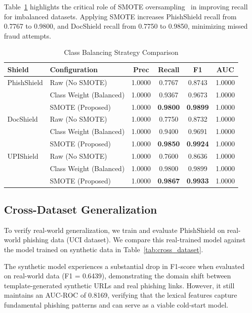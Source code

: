 \documentclass[journal]{IEEEtran}
\begin{document}
Table~\ref{tab:smote_ablation} highlights the critical role of SMOTE oversampling~\cite{smote2002} in improving recall for imbalanced datasets. Applying SMOTE increases PhishShield recall from 0.7767 to 0.9800, and DocShield recall from 0.7750 to 0.9850, minimizing missed fraud attempts.

\begin{table}[!h]
\centering
\caption{Class Balancing Strategy Comparison}
\label{tab:smote_ablation}
\begin{tabular}{llcccc}
\toprule
\textbf{Shield} & \textbf{Configuration} & \textbf{Prec} & \textbf{Recall} & \textbf{F1} & \textbf{AUC} \\
\midrule
PhishShield & Raw (No SMOTE) & 1.0000 & 0.7767 & 0.8743 & 1.0000 \\
& Class Weight (Balanced) & 1.0000 & 0.9367 & 0.9673 & 1.0000 \\
& SMOTE (Proposed) & 1.0000 & \textbf{0.9800} & \textbf{0.9899} & 1.0000 \\
\midrule
DocShield & Raw (No SMOTE) & 1.0000 & 0.7750 & 0.8732 & 1.0000 \\
& Class Weight (Balanced) & 1.0000 & 0.9400 & 0.9691 & 1.0000 \\
& SMOTE (Proposed) & 1.0000 & \textbf{0.9850} & \textbf{0.9924} & 1.0000 \\
\midrule
UPIShield & Raw (No SMOTE) & 1.0000 & 0.7600 & 0.8636 & 1.0000 \\
& Class Weight (Balanced) & 1.0000 & 0.9800 & 0.9899 & 1.0000 \\
& SMOTE (Proposed) & 1.0000 & \textbf{0.9867} & \textbf{0.9933} & 1.0000 \\
\bottomrule
\end{tabular}
\end{table}

\subsection{Cross-Dataset Generalization}
To verify real-world generalization, we train and evaluate PhishShield on real-world phishing data (UCI dataset). We compare this real-trained model against the model trained on synthetic data in Table~\ref{tab:cross_dataset}.

The synthetic model experiences a substantial drop in F1-score when evaluated on real-world data (F1 = 0.6439), demonstrating the domain shift between template-generated synthetic URLs and real phishing links. However, it still maintains an AUC-ROC of 0.8169, verifying that the lexical features capture fundamental phishing patterns and can serve as a viable cold-start model.
\end{document}
